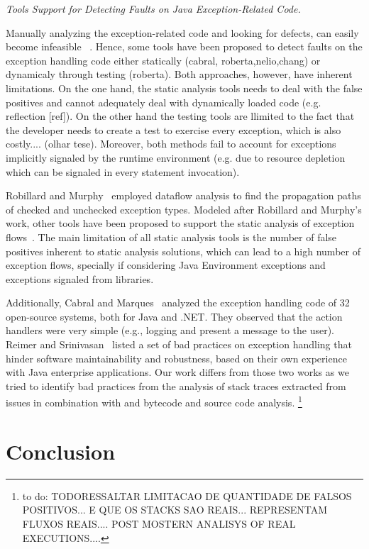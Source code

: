 \documentclass[conference]{IEEEtran}
\begin{document}
\textit{Tools Support for Detecting Faults on Java Exception-Related Code.} 

Manually analyzing the exception-related code and looking for defects, can easily 
become infeasible ~\cite{Robil00}. Hence, some tools have been proposed to detect faults 
on the exception handling code either statically (cabral, roberta,nelio,chang) 
or dynamicaly through testing (roberta). Both approaches, however, have inherent
 limitations. On the one hand, the static analysis tools needs to deal with the false 
positives and cannot adequately deal with dynamically loaded code (e.g. reflection  
[ref]). On the other hand the testing tools are llimited to the fact that the developer
 needs to create a test to exercise every exception, which is also costly.... (olhar tese). 
Moreover, both methods fail to account for exceptions implicitly signaled by the runtime 
environment (e.g. due to resource depletion which can be signaled in every statement invocation). 

Robillard and Murphy~\cite{Robil00}
employed dataflow analysis to find the propagation paths of checked and
unchecked exception types. Modeled after Robillard and Murphy's work, other
tools have been proposed to support the static analysis of exception
flows~\cite{coelho2008assessing}. The main limitation of all
static analysis tools is the number of false positives inherent to static analysis
solutions, which can lead to a high number of exception flows, specially if
considering Java Environment exceptions and exceptions signaled from libraries.
 
Additionally, Cabral and Marques~\cite{cabral2007exception} analyzed the
exception handling code of 32 open-source systems, both for Java and .NET. They
observed that the action handlers were very simple (e.g., logging and present a
message to the user). Reimer and Srinivasan~\cite{reimer2003analyzing} listed a
set of bad practices on exception handling that hinder software maintainability
and robustness, based on their own experience with Java enterprise applications.
Our work differs from those two works as we tried to identify bad practices from
the analysis of stack traces extracted from issues in combination with and bytecode and source
code analysis. \footnote{ to do: TODORESSALTAR LIMITACAO DE QUANTIDADE DE FALSOS POSITIVOS... E QUE OS STACKS SAO REAIS...
REPRESENTAM FLUXOS REAIS.... POST MOSTERN ANALISYS OF REAL EXECUTIONS....}

\enlargethispage{-2\baselineskip}

\section{Conclusion}
\label{sec:conc}
\end{document}
